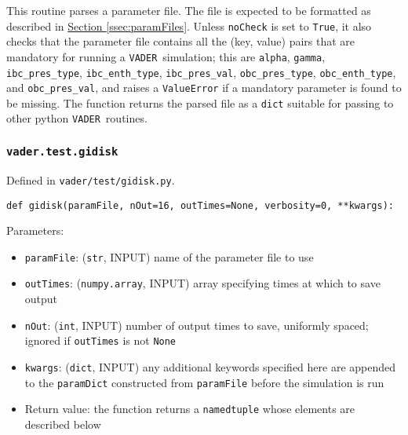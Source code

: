 \documentclass[12pt]{article}
\newcommand{\vader}{\texttt{VADER}}
\begin{document}
This routine parses a parameter file. The file is expected to be formatted as described in \hyperref[ssec:paramFiles]{Section \ref{ssec:paramFiles}}. Unless \verb=noCheck= is set to \verb=True=, it also checks that the parameter file contains all the (key, value) pairs that are mandatory for running a \vader\ simulation; this are \verb=alpha=, \verb=gamma=, \verb=ibc_pres_type=, \verb=ibc_enth_type=, \verb=ibc_pres_val=, \verb=obc_pres_type=, \verb=obc_enth_type=, and \verb=obc_pres_val=, and raises a \verb=ValueError= if a mandatory parameter is found to be missing. The function returns the parsed file as a \verb=dict= suitable for passing to other python \vader\ routines.

\subsubsection{\texttt{vader.test.gidisk}}
\label{sssec:vader.test.gidisk}

Defined in \verb=vader/test/gidisk.py=.

\begin{verbatim}
def gidisk(paramFile, nOut=16, outTimes=None, verbosity=0, **kwargs):
\end{verbatim}

Parameters:
\begin{itemize}
\item \texttt{paramFile}: (\texttt{str}, INPUT) name of the parameter file to use
\item \texttt{outTimes}: (\texttt{numpy.array}, INPUT) array specifying times at which to save output
\item \texttt{nOut}: (\texttt{int}, INPUT) number of output times to save, uniformly spaced; ignored if \texttt{outTimes} is not \texttt{None}
\item \verb=kwargs=: (\verb=dict=, INPUT) any additional keywords specified here are appended to the \texttt{paramDict} constructed from \texttt{paramFile} before the simulation is run
\item Return value: the function returns a \texttt{namedtuple} whose elements are described below
\end{itemize}
\end{document}
